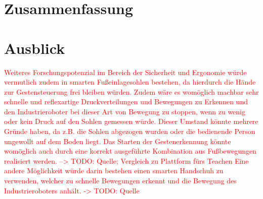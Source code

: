 \section{Zusammenfassung}


\section{Ausblick}






\textcolor{red}{
Weiteres Forschungspotenzial im Bereich der Sicherheit und Ergonomie würde vermutlich zudem in smarten Fußeinlagesohlen bestehen, da hierdurch die Hände zur Gestensteuerung frei bleiben würden. Zudem wäre es womöglich machbar sehr schnelle und reflexartige Druckverteilungen und Bewegungen zu Erkennen und den Industrieroboter bei dieser Art von Bewegung zu stoppen, wenn zu wenig oder kein Druck auf den Sohlen gemessen würde. Dieser Umstand könnte mehrere Gründe haben, da z.B. die Sohlen abgezogen wurden oder die bedienende Person ungewollt auf dem Boden liegt. Das Starten der Gestenerkennung könnte womöglich auch durch eine korrekt ausgeführte Kombination aus Fußbewegungen realisiert werden. --> TODO: Quelle; Vergleich zu Plattform fürs Teachen\newline
\newline
Eine andere Möglichkeit würde darin bestehen einen smarten Handschuh zu verwenden, welcher zu schnelle Bewegungen erkennt und die Bewegung des Industrieroboters anhält. -> TODO: Quelle
}
